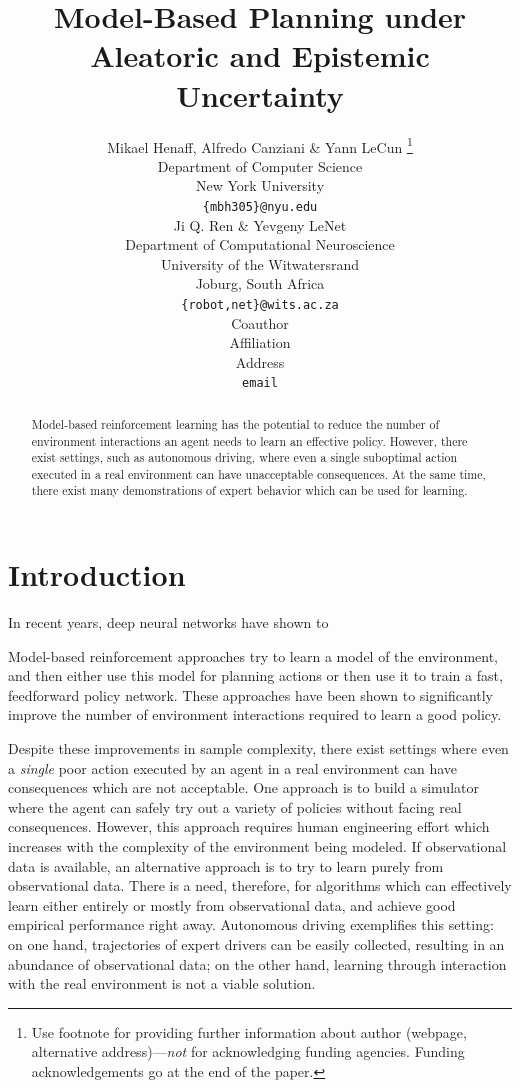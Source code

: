 \documentclass{article} %
\title{Model-Based Planning under Aleatoric and Epistemic Uncertainty}
\author{Mikael Henaff, Alfredo Canziani \& Yann LeCun \thanks{ Use footnote for providing further information
about author (webpage, alternative address)---\emph{not} for acknowledging
funding agencies.  Funding acknowledgements go at the end of the paper.} \\
Department of Computer Science\\
New York University\\
\texttt{\{mbh305\}@nyu.edu} \\
\And
Ji Q. Ren \& Yevgeny LeNet \\
Department of Computational Neuroscience \\
University of the Witwatersrand \\
Joburg, South Africa \\
\texttt{\{robot,net\}@wits.ac.za} \\
\AND
Coauthor \\
Affiliation \\
Address \\
\texttt{email}
}
\begin{document}
\maketitle

\begin{abstract}
  Model-based reinforcement learning has the potential to reduce the number of environment interactions an agent needs to learn an effective policy.
  However, there exist settings, such as autonomous driving, where even a single suboptimal action executed in a real environment can have unacceptable consequences.
  At the same time, there exist many demonstrations of expert behavior which can be used for learning.
\end{abstract}

\section{Introduction}

In recent years, deep neural networks have shown to


Model-based reinforcement approaches try to learn a model of the environment, and then either use this model for planning actions or then use it to train a fast, feedforward policy network.
These approaches have been shown to significantly improve the number of environment interactions required to learn a good policy.

Despite these improvements in sample complexity, there exist settings where even a \textit{single} poor action executed by an agent in a real environment can have consequences which are not acceptable.
One approach is to build a simulator where the agent can safely try out a variety of policies without facing real consequences.
However, this approach requires human engineering effort which increases with the complexity of the environment being modeled.
If observational data is available, an alternative approach is to try to learn purely from observational data.
There is a need, therefore, for algorithms which can effectively learn either entirely or mostly from observational data, and achieve good empirical performance right away.
Autonomous driving exemplifies this setting: on one hand, trajectories of expert drivers can be easily collected, resulting in an abundance of observational data; on the other hand, learning through interaction with the real environment is not a viable solution.
\end{document}
